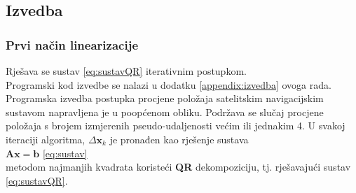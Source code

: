 \documentclass[a4paper,twoside,12pt]{memoir} %
\begin{document}
\subsection{Izvedba}
\subsubsection{Prvi način linearizacije}
Rješava se sustav \ref{eq:sustavQR} iterativnim postupkom.\\
Programski kod izvedbe se nalazi u dodatku \ref{appendix:izvedba} ovoga rada.\\
Programska izvedba postupka procjene položaja satelitskim navigacijskim sustavom napravljena je u poopćenom obliku. Podržava se slučaj procjene položaja s brojem izmjerenih pseudo-udaljenosti većim ili jednakim 4.
U svakoj iteraciji algoritma, $\Delta \mathbf{x}_k$ je pronađen kao rješenje sustava\\
$\mathbf{A}\mathbf{x} = \mathbf{b}$ \ref{eq:sustav}\\
metodom najmanjih kvadrata koristeći \textbf{QR} dekompoziciju, tj. rješavajući sustav \ref{eq:sustavQR}.
\end{document}
